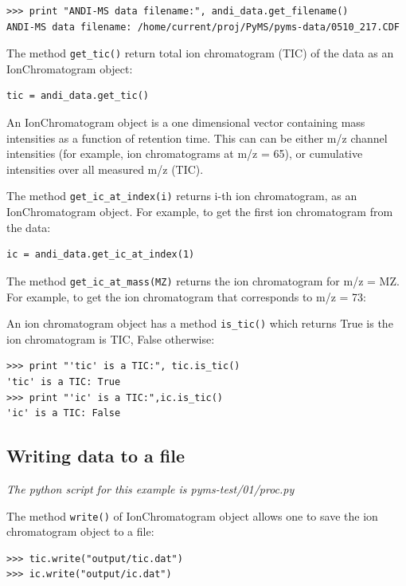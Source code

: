 \begin{verbatim}
>>> print "ANDI-MS data filename:", andi_data.get_filename()
ANDI-MS data filename: /home/current/proj/PyMS/pyms-data/0510_217.CDF
\end{verbatim}

The method {\tt get\_tic()} return total ion chromatogram (TIC) of the data
as an IonChromatogram object:

\begin{verbatim}
tic = andi_data.get_tic()
\end{verbatim}

\noindent
An IonChromatogram object is a one dimensional vector containing
mass intensities as a function of retention time. This can can be either
m/z channel intensities (for example, ion chromatograms at m/z = 65),
or cumulative intensities over all measured m/z (TIC).

The method {\tt get\_ic\_at\_index(i)} returns i-th ion chromatogram, as
an IonChromatogram object. For example, to get the first ion chromatogram
from the data:

\begin{verbatim}
ic = andi_data.get_ic_at_index(1)
\end{verbatim}

The method {\tt get\_ic\_at\_mass(MZ)} returns the ion chromatogram for
m/z = MZ.  For example, to get the ion chromatogram that corresponds
to m/z = 73:

An ion chromatogram object has a method {\tt is\_tic()} which returns
True is the ion chromatogram is TIC, False otherwise:

\begin{verbatim}
>>> print "'tic' is a TIC:", tic.is_tic()
'tic' is a TIC: True
>>> print "'ic' is a TIC:",ic.is_tic()
'ic' is a TIC: False
\end{verbatim}

\subsection{Writing data to a file}

\noindent
{\em The python script for this example is pyms-test/01/proc.py}

The method {\tt write()} of IonChromatogram object allows one to save
the ion chromatogram object to a file:

\begin{verbatim}
>>> tic.write("output/tic.dat")
>>> ic.write("output/ic.dat")
\end{verbatim}

